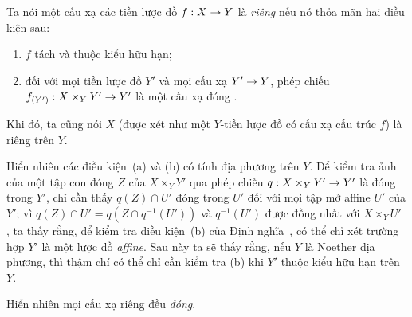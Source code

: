 \documentclass[oneside,10pt]{amsart}
\makeatletter
\newcommand{\ega@arrow}[2]{\mathchoice{#1}{#2}{#2}{#2}}
\renewcommand{\to}{\ega@arrow{\longrightarrow}{\rightarrow}}
\let\EGAOriginalLabel\label
\renewcommand{\label}[1]{\phantomsection\EGAOriginalLabel{#1}}
\makeatother
\begin{document}
\begin{definition}[5.4.1]
\label{II.5.4.1}
Ta nói một cấu xạ các tiền lược đồ $f:X\to Y$ là \emph{riêng} nếu nó thỏa mãn hai điều kiện sau:
\begin{enumerate}
  \item[(a)] $f$ tách và thuộc kiểu hữu hạn;
  \item[(b)] đối với mọi tiền lược đồ $Y'$ và mọi cấu xạ $Y'\to Y$, phép chiếu $f_{(Y')}:X\times_Y Y'\to Y'$ là một cấu xạ đóng .
\end{enumerate}

Khi đó, ta cũng nói $X$ (được xét như một $Y$-tiền lược đồ có cấu xạ cấu trúc $f$) là riêng trên $Y$.
\end{definition}

Hiển nhiên các điều kiện~(a) và (b) có tính địa phương trên $Y$.
Để kiểm tra ảnh của một tập con đóng $Z$ của $X\times_Y Y'$ qua phép chiếu $q:X\times_Y Y'\to Y'$ là đóng trong $Y'$, chỉ cần thấy $q(Z)\cap U'$ đóng trong $U'$ đối với mọi tập mở affine $U'$ của $Y'$;
vì $q(Z)\cap U'=q(Z\cap q^{-1}(U'))$ và $q^{-1}(U')$ được đồng nhất với $X\times_Y U'$ , ta thấy rằng, để kiểm tra điều kiện~(b) của Định nghĩa~, có thể chỉ xét trường hợp $Y'$ là một lược đồ \emph{affine}.
Sau này ta sẽ thấy  rằng, nếu $Y$ là Noether địa phương, thì thậm chí có thể chỉ cần kiểm tra (b) khi $Y'$ thuộc kiểu hữu hạn trên $Y$.

Hiển nhiên mọi cấu xạ riêng đều \emph{đóng}.
\end{document}
